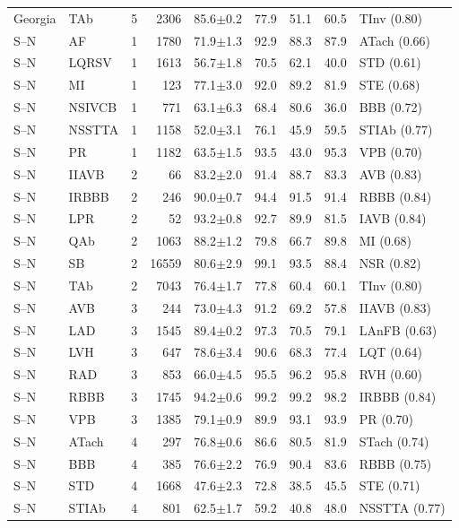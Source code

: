 \begin{longtable}{@{}llcrrrrrl@{}}
Georgia & TAb & 5 & 2306 & 85.6$\pm$0.2 & 77.9 & 51.1 & 60.5 & TInv (0.80) \\
S--N & AF & 1 & 1780 & 71.9$\pm$1.3 & 92.9 & 88.3 & 87.9 & ATach (0.66) \\
S--N & LQRSV & 1 & 1613 & 56.7$\pm$1.8 & 70.5 & 62.1 & 40.0 & STD (0.61) \\
S--N & MI & 1 & 123 & 77.1$\pm$3.0 & 92.0 & 89.2 & 81.9 & STE (0.68) \\
S--N & NSIVCB & 1 & 771 & 63.1$\pm$6.3 & 68.4 & 80.6 & 36.0 & BBB (0.72) \\
S--N & NSSTTA & 1 & 1158 & 52.0$\pm$3.1 & 76.1 & 45.9 & 59.5 & STIAb (0.77) \\
S--N & PR & 1 & 1182 & 63.5$\pm$1.5 & 93.5 & 43.0 & 95.3 & VPB (0.70) \\
S--N & IIAVB & 2 & 66 & 83.2$\pm$2.0 & 91.4 & 88.7 & 83.3 & AVB (0.83) \\
S--N & IRBBB & 2 & 246 & 90.0$\pm$0.7 & 94.4 & 91.5 & 91.4 & RBBB (0.84) \\
S--N & LPR & 2 & 52 & 93.2$\pm$0.8 & 92.7 & 89.9 & 81.5 & IAVB (0.84) \\
S--N & QAb & 2 & 1063 & 88.2$\pm$1.2 & 79.8 & 66.7 & 89.8 & MI (0.68) \\
S--N & SB & 2 & 16559 & 80.6$\pm$2.9 & 99.1 & 93.5 & 88.4 & NSR (0.82) \\
S--N & TAb & 2 & 7043 & 76.4$\pm$1.7 & 77.8 & 60.4 & 60.1 & TInv (0.80) \\
S--N & AVB & 3 & 244 & 73.0$\pm$4.3 & 91.2 & 69.2 & 57.8 & IIAVB (0.83) \\
S--N & LAD & 3 & 1545 & 89.4$\pm$0.2 & 97.3 & 70.5 & 79.1 & LAnFB (0.63) \\
S--N & LVH & 3 & 647 & 78.6$\pm$3.4 & 90.6 & 68.3 & 77.4 & LQT (0.64) \\
S--N & RAD & 3 & 853 & 66.0$\pm$4.5 & 95.5 & 96.2 & 95.8 & RVH (0.60) \\
S--N & RBBB & 3 & 1745 & 94.2$\pm$0.6 & 99.2 & 99.2 & 98.2 & IRBBB (0.84) \\
S--N & VPB & 3 & 1385 & 79.1$\pm$0.9 & 89.9 & 93.1 & 93.9 & PR (0.70) \\
S--N & ATach & 4 & 297 & 76.8$\pm$0.6 & 86.6 & 80.5 & 81.9 & STach (0.74) \\
S--N & BBB & 4 & 385 & 76.6$\pm$2.2 & 76.9 & 90.4 & 83.6 & RBBB (0.75) \\
S--N & STD & 4 & 1668 & 47.6$\pm$2.3 & 72.8 & 38.5 & 45.5 & STE (0.71) \\
S--N & STIAb & 4 & 801 & 62.5$\pm$1.7 & 59.2 & 40.8 & 48.0 & NSSTTA (0.77) \\

\end{longtable}
